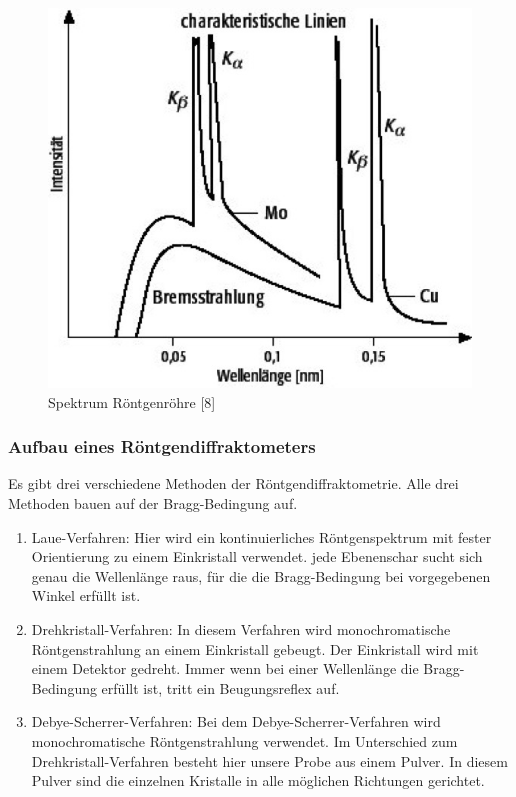             \begin{figure}[H]
                \centering
                \includegraphics{images/Spektrum_Röntgenröhre.jpg}
                \caption{Spektrum Röntgenröhre [8]}
            \end{figure}

        \subsubsection{Aufbau eines Röntgendiffraktometers}   
            Es gibt drei verschiedene Methoden der Röntgendiffraktometrie. Alle drei Methoden bauen auf der Bragg-Bedingung auf.
            \begin{enumerate}
                \item   Laue-Verfahren: Hier wird ein kontinuierliches Röntgenspektrum mit fester Orientierung zu einem Einkristall verwendet. 
                        jede Ebenenschar sucht sich genau die Wellenlänge raus, für die die Bragg-Bedingung bei vorgegebenen Winkel erfüllt ist.
                \item   Drehkristall-Verfahren: In diesem Verfahren wird monochromatische Röntgenstrahlung an einem Einkristall gebeugt. Der Einkristall 
                        wird mit einem Detektor gedreht. Immer wenn bei einer Wellenlänge die Bragg-Bedingung erfüllt ist, tritt ein Beugungsreflex auf.
                \item   Debye-Scherrer-Verfahren: Bei dem Debye-Scherrer-Verfahren wird monochromatische Röntgenstrahlung verwendet. Im Unterschied
                        zum Drehkristall-Verfahren besteht hier unsere Probe aus einem Pulver. In diesem Pulver sind die einzelnen Kristalle in alle möglichen 
                        Richtungen gerichtet. 
            \end{enumerate}

